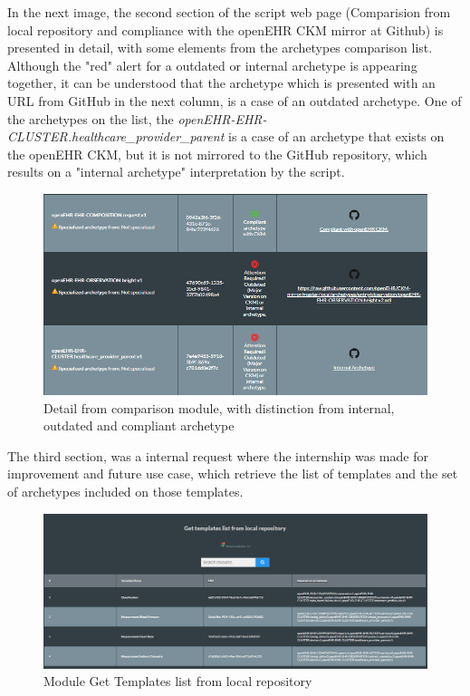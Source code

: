 \documentclass[mim_thesis.tex]{subfiles}
\begin{document}
In the next image, the second section of the script web page (Comparision from local repository and compliance with the openEHR CKM mirror at Github) is presented in detail, with some elements from the archetypes comparison list. Although the "red" alert for a outdated or internal archetype is appearing together, it can be understood that the archetype which is presented with an URL from GitHub in the next column, is a case of an outdated archetype. One of the archetypes on the list, the \textit{openEHR-EHR-CLUSTER.healthcare\_provider\_parent} is a case of an archetype that exists on the openEHR CKM, but it is not mirrored to the GitHub repository, which results on a "internal archetype" interpretation by the script.

\begin{figure}[H]
	\centering
    \includegraphics[width=1\textwidth]{img/arch_comparison_2.PNG}
	\caption{Detail from comparison module, with distinction from internal, outdated and compliant archetype}
	\label{fig:arch_comparison_2}
\end{figure}


The third section, was a internal request where the internship was made for improvement and future use case, which retrieve the list of templates and the set of archetypes included on those templates.

\begin{figure}[H]
	\centering
    \includegraphics[width=1\textwidth]{img/get_temp_list.PNG}
	\caption{Module Get Templates list from local repository }
	\label{fig:get_temp_list}
\end{figure}
\end{document}
